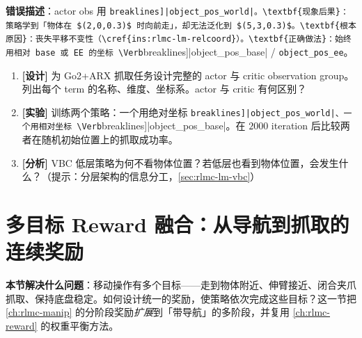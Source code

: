 \begin{pitfall}[物体位置用世界坐标而非相对坐标]
\textbf{错误描述}：actor obs 用 \Verb[breaklines]|object_pos_world|。\textbf{现象后果}：策略学到「物体在 $(2,0,0.3)$ 时向前走」，却无法泛化到 $(5,3,0.3)$。\textbf{根本原因}：丧失平移不变性（\cref{ins:rlmc-lm-relcoord}）。\textbf{正确做法}：始终用相对 base 或 EE 的坐标 \Verb[breaklines]|object_pos_base| / \verb|object_pos_ee|。
\end{pitfall}


\begin{practice}[练习·观测融合]
\begin{enumerate}
\item \textbf{[设计]} 为 Go2+ARX 抓取任务设计完整的 actor 与 critic observation group。列出每个 term 的名称、维度、坐标系。actor 与 critic 有何区别？
\item \textbf{[实验]} 训练两个策略：一个用绝对坐标 \Verb[breaklines]|object_pos_world|、一个用相对坐标 \Verb[breaklines]|object_pos_base|。在 $2000$ iteration 后比较两者在随机初始位置上的抓取成功率。
\item \textbf{[分析]} VBC 低层策略为何不看物体位置？若低层也看到物体位置，会发生什么？（提示：分层架构的信息分工，\cref{sec:rlmc-lm-vbc}）
\end{enumerate}
\end{practice}

\section{多目标 Reward 融合：从导航到抓取的连续奖励}
\label{sec:rlmc-lm-reward}

\textbf{本节解决什么问题}：移动操作有多个目标——走到物体附近、伸臂接近、闭合夹爪抓取、保持底盘稳定。如何设计统一的奖励，使策略依次完成这些目标？这一节把 \cref{ch:rlmc-manip} 的分阶段奖励\emph{扩展}到「带导航」的多阶段，并复用 \cref{ch:rlmc-reward} 的权重平衡方法。

